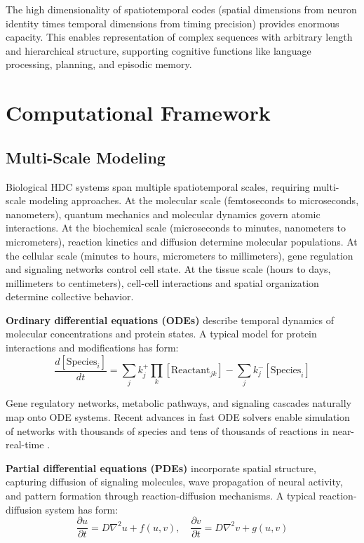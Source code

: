 \documentclass[12pt]{article}
\begin{document}
The high dimensionality of spatiotemporal codes (spatial dimensions from neuron identity times temporal dimensions from timing precision) provides enormous capacity. This enables representation of complex sequences with arbitrary length and hierarchical structure, supporting cognitive functions like language processing, planning, and episodic memory.

\section{Computational Framework}

\subsection{Multi-Scale Modeling}

Biological HDC systems span multiple spatiotemporal scales, requiring multi-scale modeling approaches. At the molecular scale (femtoseconds to microseconds, nanometers), quantum mechanics and molecular dynamics govern atomic interactions. At the biochemical scale (microseconds to minutes, nanometers to micrometers), reaction kinetics and diffusion determine molecular populations. At the cellular scale (minutes to hours, micrometers to millimeters), gene regulation and signaling networks control cell state. At the tissue scale (hours to days, millimeters to centimeters), cell-cell interactions and spatial organization determine collective behavior.

\textbf{Ordinary differential equations (ODEs)} describe temporal dynamics of molecular concentrations and protein states. A typical model for protein interactions and modifications has form:
\begin{equation}
\frac{d[\text{Species}_i]}{dt} = \sum_j k_j^+ \prod_k [\text{Reactant}_{jk}] - \sum_j k_j^- [\text{Species}_i]
\end{equation}

Gene regulatory networks, metabolic pathways, and signaling cascades naturally map onto ODE systems. Recent advances in fast ODE solvers enable simulation of networks with thousands of species and tens of thousands of reactions in near-real-time \citep{Cohen2014}.

\textbf{Partial differential equations (PDEs)} incorporate spatial structure, capturing diffusion of signaling molecules, wave propagation of neural activity, and pattern formation through reaction-diffusion mechanisms. A typical reaction-diffusion system has form:
\begin{equation}
\frac{\partial u}{\partial t} = D \nabla^2 u + f(u, v), \quad \frac{\partial v}{\partial t} = D \nabla^2 v + g(u, v)
\end{equation}
\end{document}

